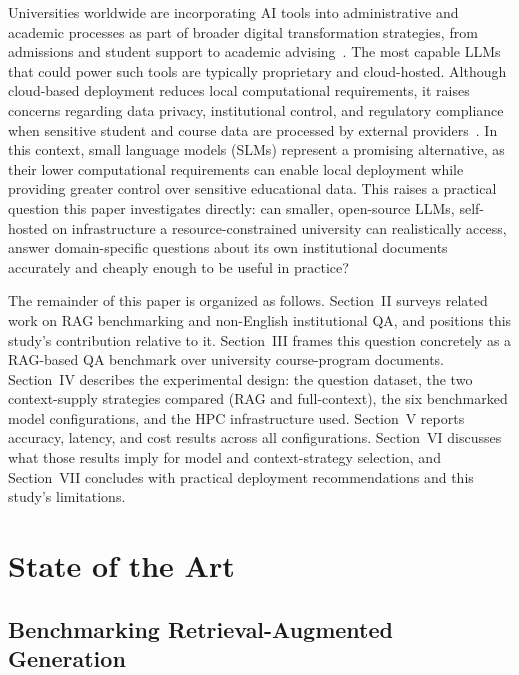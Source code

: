 \documentclass[conference]{IEEEtran}
\begin{document}
Universities worldwide are incorporating \gls{AI} tools into administrative and academic processes as part of broader digital transformation strategies, from admissions and student support to academic advising~\cite{dawson2026leveraging}.
The most capable \glspl{LLM} that could power such tools are typically proprietary and cloud-hosted.
Although cloud-based deployment reduces local computational requirements, it raises concerns regarding data privacy, institutional control, and regulatory compliance when sensitive student and course data are processed by external providers~\cite{yan2025ethical}.
In this context, small language models (SLMs) represent a promising alternative, as their lower computational requirements can enable local deployment while providing greater control over sensitive educational data.
This raises a practical question this paper investigates directly: can smaller, open-source \glspl{LLM}, self-hosted on infrastructure a resource-constrained university can realistically access, answer domain-specific questions about its own institutional documents accurately and cheaply enough to be useful in practice?

The remainder of this paper is organized as follows.
Section~II surveys related work on \gls{RAG} benchmarking and non-English institutional \gls{QA}, and positions this study's contribution relative to it.
Section~III frames this question concretely as a \gls{RAG}-based \gls{QA} benchmark over university course-program documents.
Section~IV describes the experimental design: the question dataset, the two context-supply strategies compared (\gls{RAG} and full-context), the six benchmarked model configurations, and the \gls{HPC} infrastructure used.
Section~V reports accuracy, latency, and cost results across all configurations.
Section~VI discusses what those results imply for model and context-strategy selection, and Section~VII concludes with practical deployment recommendations and this study's limitations.

\section{State of the Art}

\subsection{Benchmarking Retrieval-Augmented Generation}
\end{document}
